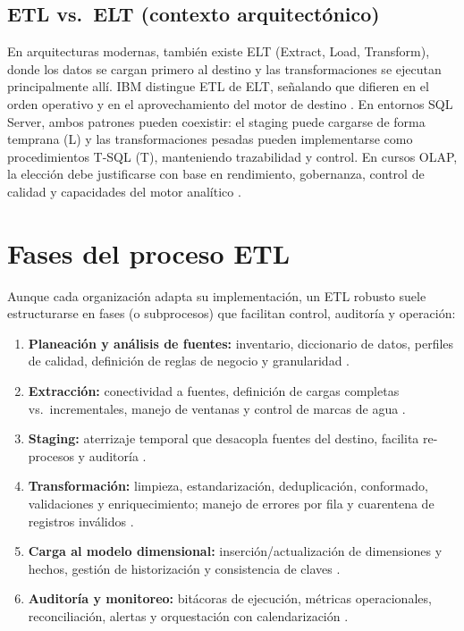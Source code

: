 \documentclass[12pt]{article}
\begin{document}
\subsection{ETL vs.\ ELT (contexto arquitectónico)}
En arquitecturas modernas, también existe ELT (Extract, Load, Transform), donde los datos se cargan primero al destino y las transformaciones se ejecutan principalmente allí. IBM distingue ETL de ELT, señalando que difieren en el orden operativo y en el aprovechamiento del motor de destino \cite{ibm_elt}. En entornos SQL Server, ambos patrones pueden coexistir: el staging puede cargarse de forma temprana (L) y las transformaciones pesadas pueden implementarse como procedimientos T-SQL (T), manteniendo trazabilidad y control. En cursos OLAP, la elección debe justificarse con base en rendimiento, gobernanza, control de calidad y capacidades del motor analítico \cite{kimball_etl_toolkit}.

\section{Fases del proceso ETL}
Aunque cada organización adapta su implementación, un ETL robusto suele estructurarse en fases (o subprocesos) que facilitan control, auditoría y operación:

\begin{enumerate}[label=\textbf{F\arabic*.}, leftmargin=*]
\item \textbf{Planeación y análisis de fuentes:} inventario, diccionario de datos, perfiles de calidad, definición de reglas de negocio y granularidad \cite{kimball_etl_toolkit}.
\item \textbf{Extracción:} conectividad a fuentes, definición de cargas completas vs.\ incrementales, manejo de ventanas y control de marcas de agua \cite{ibm_etl,ms_cdc_overview}.
\item \textbf{Staging:} aterrizaje temporal que desacopla fuentes del destino, facilita re-procesos y auditoría \cite{kimball_etl_toolkit}.
\item \textbf{Transformación:} limpieza, estandarización, deduplicación, conformado, validaciones y enriquecimiento; manejo de errores por fila y cuarentena de registros inválidos \cite{kimball_etl_toolkit}.
\item \textbf{Carga al modelo dimensional:} inserción/actualización de dimensiones y hechos, gestión de historización y consistencia de claves \cite{kimball_etl_toolkit}.
\item \textbf{Auditoría y monitoreo:} bitácoras de ejecución, métricas operacionales, reconciliación, alertas y orquestación con calendarización \cite{kimball_etl_toolkit}.
\end{enumerate}
\end{document}
